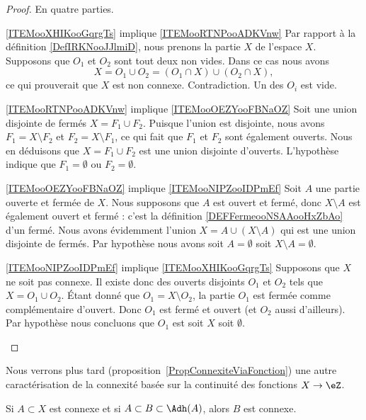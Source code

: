 \begin{proof}
	En quatre parties.
	\begin{subproof}
		\item[\ref{ITEMooXHIKooGqrgTs} implique \ref{ITEMooRTNPooADKVnw}]
		Par rapport à la définition \ref{DefIRKNooJJlmiD}, nous prenons la partie \( X\) de l'espace \( X\). Supposons que \( O_1\) et \( O_2\) sont tout deux non vides. Dans ce cas nous avons
		\begin{equation}
			X= O_1\cup O_2 = (O_1\cap X)\cup (O_2\cap X),
		\end{equation}
		ce qui prouverait que \( X\) est non connexe. Contradiction. Un des \( O_i\) est vide.
		\item[\ref{ITEMooRTNPooADKVnw} implique \ref{ITEMooOEZYooFBNaOZ}]
		Soit une union disjointe de fermés \( X=F_1\cup F_2\). Puisque l'union est disjointe, nous avons \( F_1=X\setminus F_2\) et \( F_2=X\setminus F_1\), ce qui fait que \( F_1\) et \( F_2\) sont également ouverts. Nous en déduisons que \( X=F_1\cup F_2\) est une union disjointe d'ouverts. L'hypothèse indique que \( F_1=\emptyset\) ou \( F_2=\emptyset\).
		\item[\ref{ITEMooOEZYooFBNaOZ} implique \ref{ITEMooNIPZooIDPmEf}]
		Soit \( A\) une partie ouverte et fermée de \( X\). Nous supposons que \( A\) est ouvert et fermé, donc \( X\setminus A\) est également ouvert et fermé : c'est la définition \ref{DEFFermeooNSAAooHxZbAo} d'un fermé. Nous avons évidemment l'union $X=A\cup(X\setminus A)$ qui est une union disjointe de fermés. Par hypothèse nous avons soit \( A=\emptyset\) soit \( X\setminus A=\emptyset\).
		\item[\ref{ITEMooNIPZooIDPmEf} implique \ref{ITEMooXHIKooGqrgTs}]
		Supposons que \( X\) ne soit pas connexe. Il existe donc des ouverts disjoints \( O_1\) et \( O_2\) tels que \( X=O_1\cup O_2\). Étant donné que \( O_1=X\setminus O_2\), la partie \( O_1\) est fermée comme complémentaire d'ouvert. Donc \( O_1\) est fermé et ouvert (et \( O_2\) aussi d'ailleurs). Par hypothèse nous concluons que \( O_1\) est soit \( X\) soit \( \emptyset\).
	\end{subproof}
\end{proof}

Nous verrons plus tard (proposition~\ref{PropConnexiteViaFonction}) une autre caractérisation de la connexité basée sur la continuité des fonctions \( X\to \eZ\).

\begin{proposition}     \label{PROPooSCKNooRbewdv}
	Si \( A\subset X\) est connexe et si \( A\subset B\subset \Adh(A)\), alors \( B\) est connexe.
\end{proposition}


